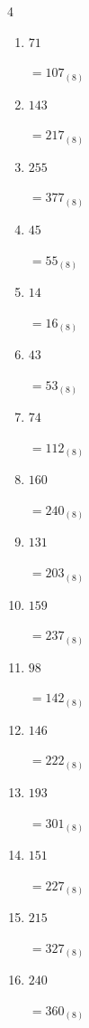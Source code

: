 \begin{multicols}{4}
\begin{enumerate}
  \item $71$

        $=107_{(8)}$

\columnbreak %

\resetques

  \item $143$

        $=217_{(8)}$

  \item $255$

        $=377_{(8)}$

  \item $45$

        $=55_{(8)}$

  \item $14$

        $=16_{(8)}$

  \item $43$

        $=53_{(8)}$

  \item $74$

        $=112_{(8)}$

  \item $160$

        $=240_{(8)}$

  \item $131$

        $=203_{(8)}$

  \item $159$

        $=237_{(8)}$

  \item $98$

        $=142_{(8)}$

  \item $146$

        $=222_{(8)}$

  \item $193$

        $=301_{(8)}$

  \item $151$

        $=227_{(8)}$

  \item $215$

        $=327_{(8)}$

  \item $240$

        $=360_{(8)}$


\end{enumerate}
\end{multicols}
